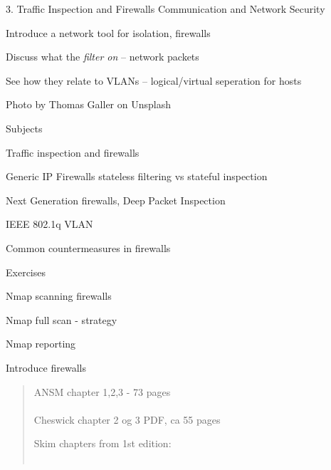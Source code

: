 \documentclass[Screen16to9,17pt]{foils}
\begin{document}
\mytitlepage
{3. Traffic Inspection and Firewalls}
{Communication and Network Security \the\year}




\begin{list2}
\item Introduce a network tool for isolation, firewalls
\item Discuss what the \emph{filter on} -- network packets
\item See how they relate to VLANs -- logical/virtual seperation for hosts
\end{list2}

Photo by Thomas Galler on Unsplash



\begin{list1}
\item Subjects
\begin{list2}
\item Traffic inspection and firewalls
\item Generic IP Firewalls stateless filtering vs stateful inspection
\item Next Generation firewalls, Deep Packet Inspection
\item IEEE 802.1q VLAN
\item Common countermeasures in firewalls
\end{list2}
\item Exercises
\begin{list2}
\item Nmap scanning firewalls
\item Nmap full scan - strategy
\item Nmap reporting
\end{list2}
\end{list1}

\centerline{\LARGE Introduce firewalls}


\begin{quote}
ANSM chapter 1,2,3 - 73 pages\\
\\
 Cheswick chapter 2 og 3 PDF, ca 55 pages
\item Skim chapters from 1st edition:\\
\\ 
\end{quote}
\end{document}
